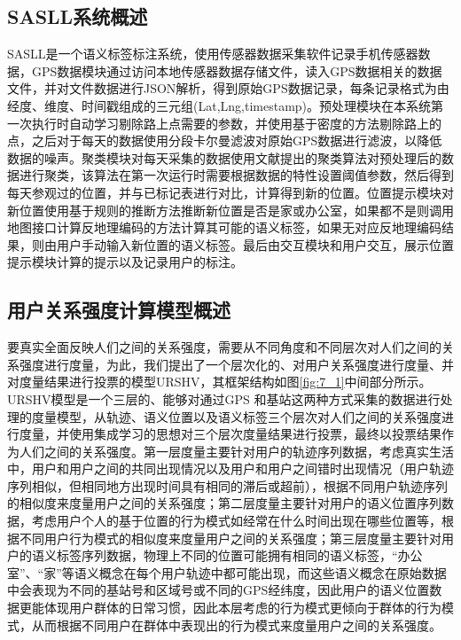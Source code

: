 \subsection{SASLL系统概述}
SASLL是一个语义标签标注系统，使用传感器数据采集软件记录手机传感器数据，GPS数据模块通过访问本地传感器数据存储文件，读入GPS数据相关的数据文件，并对文件数据进行JSON解析，得到原始GPS数据记录，每条记录格式为由经度、维度、时间戳组成的三元组(Lat,Lng,timestamp)。预处理模块在本系统第一次执行时自动学习剔除路上点需要的参数，并使用基于密度的方法剔除路上的点，之后对于每天的数据使用分段卡尔曼滤波对原始GPS数据进行滤波，以降低数据的噪声。聚类模块对每天采集的数据使用文献\cite{rodriguez2014clustering}提出的聚类算法对预处理后的数据进行聚类，该算法在第一次运行时需要根据数据的特性设置阈值参数，然后得到每天参观过的位置，并与已标记表进行对比，计算得到新的位置。位置提示模块对新位置使用基于规则的推断方法推断新位置是否是家或办公室，如果都不是则调用地图接口计算反地理编码的方法计算其可能的语义标签，如果无对应反地理编码结果，则由用户手动输入新位置的语义标签。最后由交互模块和用户交互，展示位置提示模块计算的提示以及记录用户的标注。
\subsection{用户关系强度计算模型概述}
要真实全面反映人们之间的关系强度，需要从不同角度和不同层次对人们之间的关系强度进行度量，为此，我们提出了一个层次化的、对用户关系强度进行度量、并对度量结果进行投票的模型URSHV，其框架结构如图\ref{fig:7_1}中间部分所示。URSHV模型是一个三层的、能够对通过GPS 和基站这两种方式采集的数据进行处理的度量模型，从轨迹、语义位置以及语义标签三个层次对人们之间的关系强度进行度量，并使用集成学习的思想对三个层次度量结果进行投票，最终以投票结果作为人们之间的关系强度。第一层度量主要针对用户的轨迹序列数据，考虑真实生活中，用户和用户之间的共同出现情况以及用户和用户之间错时出现情况（用户轨迹序列相似，但相同地方出现时间具有相同的滞后或超前），根据不同用户轨迹序列的相似度来度量用户之间的关系强度；第二层度量主要针对用户的语义位置序列数据，考虑用户个人的基于位置的行为模式如经常在什么时间出现在哪些位置等，根据不同用户行为模式的相似度来度量用户之间的关系强度；第三层度量主要针对用户的语义标签序列数据，物理上不同的位置可能拥有相同的语义标签，“办公室”、“家”等语义概念在每个用户轨迹中都可能出现，而这些语义概念在原始数据中会表现为不同的基站号和区域号或不同的GPS经纬度，因此用户的语义位置数据更能体现用户群体的日常习惯，因此本层考虑的行为模式更倾向于群体的行为模式，从而根据不同用户在群体中表现出的行为模式来度量用户之间的关系强度。
